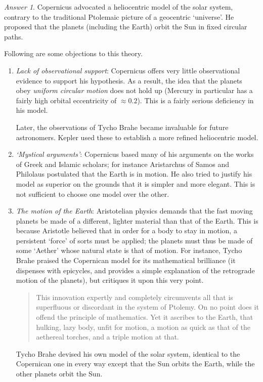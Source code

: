 \documentclass[11pt]{article}
\theoremstyle{remark}
\newtheorem*{answer}{Answer}
\begin{document}
    \begin{answer}
        Copernicus advocated a heliocentric model of the solar system, contrary to
        the traditional Ptolemaic picture of a geocentric `universe'. He proposed
        that the planets (including the Earth) orbit the Sun in fixed circular paths.

        Following are some objections to this theory.
        \begin{enumerate}
            \item \emph{Lack of observational support}: Copernicus offers very little
            observational evidence to support his hypothesis. As a result, the idea
            that the planets obey \emph{uniform circular motion} does not hold up
            (Mercury in particular has a fairly high orbital eccentricity of
            $\approx 0.2$).  This is a fairly serious deficiency in his model.

            Later, the observations of Tycho Brahe became invaluable for future
            astronomers. Kepler used these to establish a more refined heliocentric
            model.

            \item \emph{`Mystical arguments'}: Copernicus based many of his arguments
            on the works of Greek and Islamic scholars; for instance Aristarchus of
            Samos and Philolaus postulated that the Earth is in motion. He also tried
            to justify his model as superior on the grounds that it is simpler and
            more elegant. This is not sufficient to choose one model over the other.

            \item \emph{The motion of the Earth}: Aristotelian physics demands that
            the fast moving planets be made of a different, lighter material than
            that of the Earth. This is because Aristotle believed that in order for
            a body to stay in motion, a persistent `force' of sorts must be applied;
            the planets must thus be made of some `Aether' whose natural state is
            that of motion. For instance, Tycho Brahe praised the Copernican model
            for its mathematical brilliance (it dispenses with epicycles, and
            provides a simple explanation of the retrograde motion of the planets),
            but critiques it upon this very point.
            \begin{quote}
                This innovation expertly and completely circumvents all that is
                superfluous or discordant in the system of Ptolemy. On no point does
                it offend the principle of mathematics. Yet it ascribes to the Earth,
                that hulking, lazy body, unfit for motion, a motion as quick as that
                of the aethereal torches, and a triple motion at that.
            \end{quote}
            Tycho Brahe devised his own model of the solar system, identical to the
            Copernican one in every way except that the Sun orbits the Earth, while
            the other planets orbit the Sun.


\end{enumerate}
\end{answer}
\end{document}
